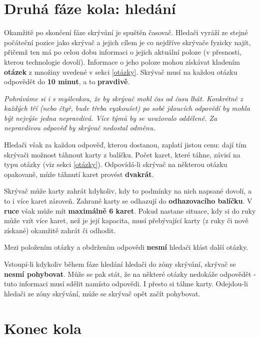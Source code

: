 \documentclass{book}
\newenvironment{reasoning}{\begin{small}\itshape}{\end{small}}
\def\timeanswerquestion/{10 minut}  %
\begin{document}
\section{Druhá fáze kola: hledání}

Okamžitě po skončení fáze skrývání je spuštěn časovač. Hledači vyráží ze stejné počáteční pozice jako skrývač a jejich cílem je co nejdříve skrývače fyzicky najít, přičemž ten má po celou dobu informaci o jejich aktuální poloze (v přesnosti, kterou technologie dovolí). Informace o jeho poloze mohou získávat kladením \textbf{otázek} z množiny uvedené v sekci \ref{otázky}. Skrývač musí na každou otázku odpovědět do \textbf{\timeanswerquestion/}, a to \textbf{pravdivě}.

\begin{reasoning}
	Pohráváme si i s myšlenkou, že by skrývač mohl čas od času lhát. Konkrétně z každých tří (nebo čtyř, bude třeba vyzkoušet) po sobě jdoucích odpovědí by mohla být nejvýše jedna nepravdivá. Více týmů by se uvažovalo odděleně. Za nepravdivou odpověď by skrývač nedostal odměnu.
\end{reasoning}

Hledači však za každou odpověď, kterou dostanou, zaplatí jistou cenu: dají tím skrývači možnost táhnout karty z balíčku. Počet karet, které táhne, závisí na typu otázky (viz sekci \ref{otázky}). Odpovídá-li skrývač na některou otázku opakovaně, může táhnutí karet provést \textbf{dvakrát}.

Skrývač může karty zahrát kdykoliv, kdy to podmínky na nich napsané dovolí, a to i více karet zároveň. Zahrané karty se odhazují do \textbf{odhazovacího balíčku}. V \textbf{ruce} však může mít \textbf{maximálně 6 karet}. Pokud nastane situace, kdy si do ruky může vzít více karet, než je její kapacita, musí přebývající karty (z ruky či nově získané) okamžitě zahrát či odhodit.

Mezi položením otázky a obdržením odpovědi \textbf{nesmí} hledači klást další otázky.

Vstoupí-li kdykoliv během fáze hledání hledači do zóny skrývání, skrývač se \textbf{nesmí pohybovat}. Může se pak stát, že na některé otázky nedokáže odpovědět - tuto informaci musí sdělit namísto odpovědi. I přesto si táhne karty. Odejdou-li hledači ze zóny skrývání, může se skrývač opět začít pohybovat.

\section{Konec kola}
\end{document}
